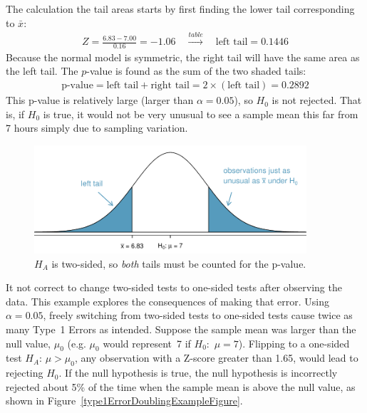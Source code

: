\begin{spacing}{1.5}
\begin{example}
The calculation the tail areas starts by first finding the lower tail corresponding to $\bar{x}$:
\begin{eqnarray*}
Z = \frac{6.83 - 7.00}{0.16} = -1.06 \quad\stackrel{table}{\rightarrow}\quad \text{left tail} = 0.1446
\end{eqnarray*}
Because the normal model is symmetric, the right tail will have the same area as the left tail. The $p$-value is found as the sum of the two shaded tails:
\begin{eqnarray*}
\text{p-value} = \text{left tail} + \text{right tail} = 2\times(\text{left tail}) = 0.2892
\end{eqnarray*}
This p-value is relatively large (larger than $\alpha=0.05$), so  $H_0$ is not rejected. That is, if $H_0$ is true, it would not be very unusual to see a sample mean this far from 7 hours simply due to sampling variation. 


\begin{figure}
   \centering
   \includegraphics[width=0.9\textwidth]
   {ch_inference_foundations_oi_biostat/figures/2ndSchSleepHTExample/2ndSchSleepHTExample}
   \caption{$H_A$ is two-sided, so \emph{both} tails must be counted for the p-value.}
   \label{2ndSchSleepHTExample}
\end{figure}

\end{example}

\begin{example}{It not correct to change two-sided tests to one-sided tests after observing the data.  This example explores the consequences of making that error. Using $\alpha=0.05$, freely switching from two-sided tests to one-sided tests cause twice as many Type~1 Errors as intended.} \label{swappingHypAfterDataDoublesType1ErrorRate}
Suppose the sample mean was larger than the null value, $\mu_0$ (e.g. $\mu_0$ would represent~7 if $H_0$:~$\mu = 7$). Flipping to a one-sided test $H_A$: $\mu > \mu_0$, any observation with a Z-score greater than 1.65, would lead to  rejecting  $H_0$. If the null hypothesis is true, the null hypothesis is incorrectly rejected about 5\% of the time when the sample mean is above the null value, as shown in Figure~\ref{type1ErrorDoublingExampleFigure}.


\end{example}
\end{spacing}
